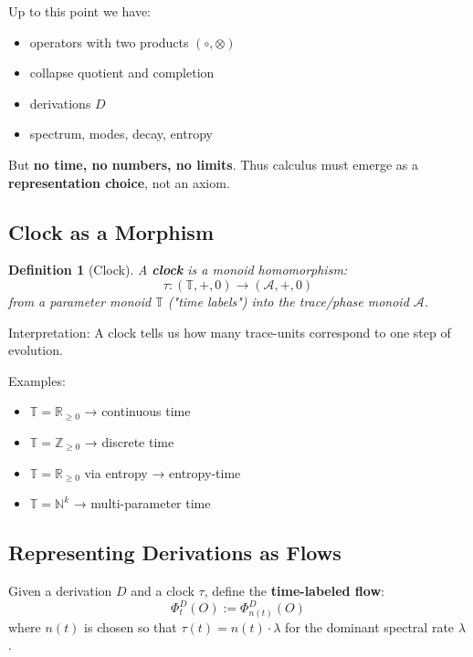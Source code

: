 \documentclass[12pt, oneside]{article}
\newtheorem{definition}[theorem]{Definition}
\newcommand{\A}{\mathcal{A}}
\begin{document}
Up to this point we have:
\begin{itemize}
    \item operators with two products $(\circ, \otimes)$
    \item collapse quotient and completion
    \item derivations $D$
    \item spectrum, modes, decay, entropy
\end{itemize}
But \textbf{no time, no numbers, no limits}. Thus calculus must emerge as a \textbf{representation choice}, not an axiom.

\subsection{Clock as a Morphism}

\begin{definition}[Clock]
A \textbf{clock} is a monoid homomorphism:
\begin{equation}
\tau: (\mathbb{T}, +, 0) \rightarrow (\A, +, 0)
\end{equation}
from a parameter monoid $\mathbb{T}$ ("time labels") into the trace/phase monoid $\A$.
\end{definition}

Interpretation: A clock tells us how many trace-units correspond to one step of evolution.

Examples:
\begin{itemize}
    \item $\mathbb{T} = \mathbb{R}_{\geq 0}$ → continuous time
    \item $\mathbb{T} = \mathbb{Z}_{\geq 0}$ → discrete time
    \item $\mathbb{T} = \mathbb{R}_{\geq 0}$ via entropy → entropy-time
    \item $\mathbb{T} = \mathbb{N}^k$ → multi-parameter time
\end{itemize}

\subsection{Representing Derivations as Flows}

Given a derivation $D$ and a clock $\tau$, define the \textbf{time-labeled flow}:
\begin{equation}
\Phi_t^D(O) := \Phi_{n(t)}^D(O)
\end{equation}
where $n(t)$ is chosen so that $\tau(t) = n(t) \cdot \lambda$ for the dominant spectral rate $\lambda$.
\end{document}
